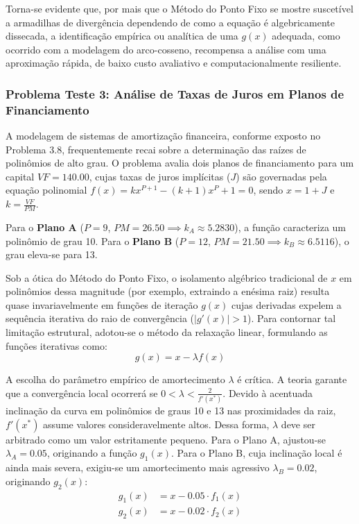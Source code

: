 Torna-se evidente que, por mais que o Método do Ponto Fixo se mostre suscetível a armadilhas de divergência dependendo de como a equação é algebricamente dissecada, a identificação empírica ou analítica de uma $g(x)$ adequada, como ocorrido com a modelagem do arco-cosseno, recompensa a análise com uma aproximação rápida, de baixo custo avaliativo e computacionalmente resiliente.

\subsubsection{Problema Teste 3: Análise de Taxas de Juros em Planos de Financiamento}
\label{subsubsec:problema_teste_3_ponto_fixo}

A modelagem de sistemas de amortização financeira, conforme exposto no Problema 3.8, frequentemente recai sobre a determinação das raízes de polinômios de alto grau. O problema avalia dois planos de financiamento para um capital $VF = 140.00$, cujas taxas de juros implícitas ($J$) são governadas pela equação polinomial $f(x) = kx^{P+1} - (k+1)x^P + 1 = 0$, sendo $x = 1+J$ e $k = \frac{VF}{PM}$.

Para o \textbf{Plano A} ($P=9$, $PM=26.50 \implies k_A \approx 5.2830$), a função caracteriza um polinômio de grau 10. Para o \textbf{Plano B} ($P=12$, $PM=21.50 \implies k_B \approx 6.5116$), o grau eleva-se para 13.

Sob a ótica do Método do Ponto Fixo, o isolamento algébrico tradicional de $x$ em polinômios dessa magnitude (por exemplo, extraindo a enésima raiz) resulta quase invariavelmente em funções de iteração $g(x)$ cujas derivadas expelem a sequência iterativa do raio de convergência ($|g'(x)| > 1$). Para contornar tal limitação estrutural, adotou-se o método da relaxação linear, formulando as funções iterativas como:
\begin{equation}
    g(x) = x - \lambda f(x)
\end{equation}

A escolha do parâmetro empírico de amortecimento $\lambda$ é crítica. A teoria garante que a convergência local ocorrerá se $0 < \lambda < \frac{2}{f'(x^*)}$. Devido à acentuada inclinação da curva em polinômios de graus 10 e 13 nas proximidades da raiz, $f'(x^*)$ assume valores consideravelmente altos. Dessa forma, $\lambda$ deve ser arbitrado como um valor estritamente pequeno. Para o Plano A, ajustou-se $\lambda_A = 0.05$, originando a função $g_1(x)$. Para o Plano B, cuja inclinação local é ainda mais severa, exigiu-se um amortecimento mais agressivo $\lambda_B = 0.02$, originando $g_2(x)$:
\begin{align}
    g_1(x) &= x - 0.05 \cdot f_1(x) \label{eq:g1_juros_ponto_fixo} \\
    g_2(x) &= x - 0.02 \cdot f_2(x) \label{eq:g2_juros_ponto_fixo}
\end{align}

